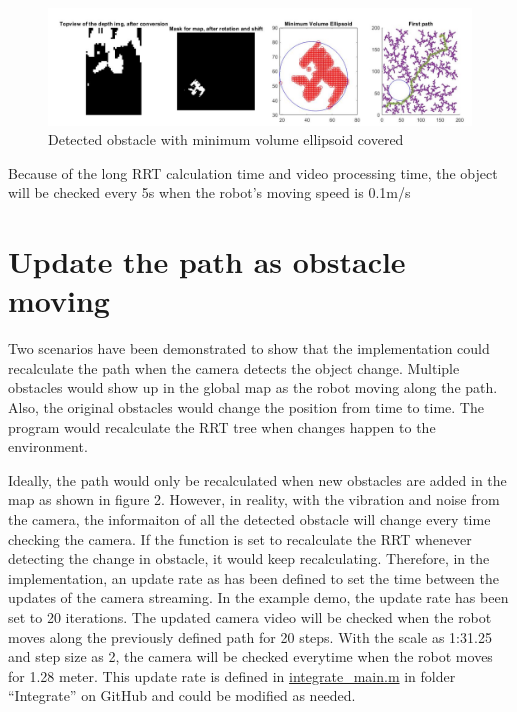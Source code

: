 \documentclass[
  oneside]{ubcthesis}
\begin{document}
\begin{figure}

{\centering \includegraphics[width=0.9\linewidth]{figures/9} 

}

\caption{Detected obstacle with minimum volume ellipsoid covered}\label{fig:figure9}
\end{figure}



Because of the long RRT calculation time and video processing time, the object will be checked every 5s when the robot's moving speed is 0.1m/s

\hypertarget{update-the-path-as-obstacle-moving}{%
\section{Update the path as obstacle moving}\label{update-the-path-as-obstacle-moving}}

Two scenarios have been demonstrated to show that the implementation could recalculate the path when the camera detects the object change. Multiple obstacles would show up in the global map as the robot moving along the path. Also, the original obstacles would change the position from time to time. The program would recalculate the RRT tree when changes happen to the environment.

Ideally, the path would only be recalculated when new obstacles are added in the map as shown in figure 2. However, in reality, with the vibration and noise from the camera, the informaiton of all the detected obstacle will change every time checking the camera. If the function is set to recalculate the RRT whenever detecting the change in obstacle, it would keep recalculating. Therefore, in the implementation, an update rate as has been defined to set the time between the updates of the camera streaming. In the example demo, the update rate has been set to 20 iterations. The updated camera video will be checked when the robot moves along the previously defined path for 20 steps. With the scale as 1:31.25 and step size as 2, the camera will be checked everytime when the robot moves for 1.28 meter. This update rate is defined in \href{https://github.com/luckymeng7/EECE597/blob/master/Integrate/integrate_main.m}{integrate\_main.m} in folder ``Integrate'' on GitHub and could be modified as needed.
\end{document}
